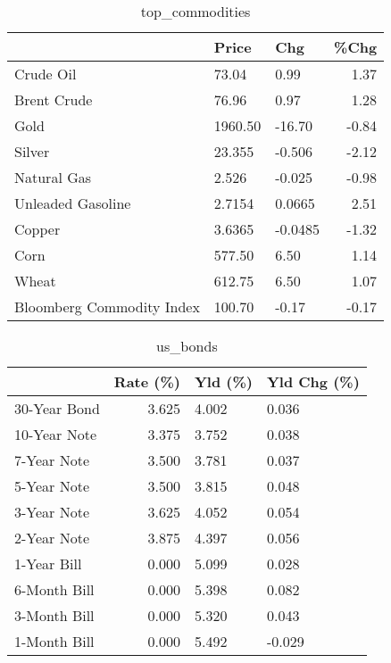 \documentclass{article}%
\begin{document}
\begin{table}[htbp]%
\caption{top\_commodities}%
\centering%
\begin{adjustbox}{width=1\textwidth}%
\begin{tabular}{lllr}
\toprule
                          &   Price &     Chg &  \%Chg \\
\midrule
               Crude Oil  &   73.04 &    0.99 &  1.37 \\
             Brent Crude  &   76.96 &    0.97 &  1.28 \\
                    Gold  & 1960.50 &  -16.70 & -0.84 \\
                  Silver  &  23.355 &  -0.506 & -2.12 \\
             Natural Gas  &   2.526 &  -0.025 & -0.98 \\
       Unleaded Gasoline  &  2.7154 &  0.0665 &  2.51 \\
                  Copper  &  3.6365 & -0.0485 & -1.32 \\
                    Corn  &  577.50 &    6.50 &  1.14 \\
                   Wheat  &  612.75 &    6.50 &  1.07 \\
Bloomberg Commodity Index &  100.70 &   -0.17 & -0.17 \\
\bottomrule
\end{tabular}
%
\end{adjustbox}%
\end{table}

%


\begin{table}[htbp]%
\caption{us\_bonds}%
\centering%
\begin{adjustbox}{width=1\textwidth}%
\begin{tabular}{lrll}
\toprule
             &  Rate (\%) & Yld (\%) & Yld Chg (\%) \\
\midrule
30-Year Bond &     3.625 &   4.002 &       0.036 \\
10-Year Note &     3.375 &   3.752 &       0.038 \\
 7-Year Note &     3.500 &   3.781 &       0.037 \\
 5-Year Note &     3.500 &   3.815 &       0.048 \\
 3-Year Note &     3.625 &   4.052 &       0.054 \\
 2-Year Note &     3.875 &   4.397 &       0.056 \\
 1-Year Bill &     0.000 &   5.099 &       0.028 \\
6-Month Bill &     0.000 &   5.398 &       0.082 \\
3-Month Bill &     0.000 &   5.320 &       0.043 \\
1-Month Bill &     0.000 &   5.492 &      -0.029 \\
\bottomrule
\end{tabular}
%
\end{adjustbox}%
\end{table}
\end{document}
